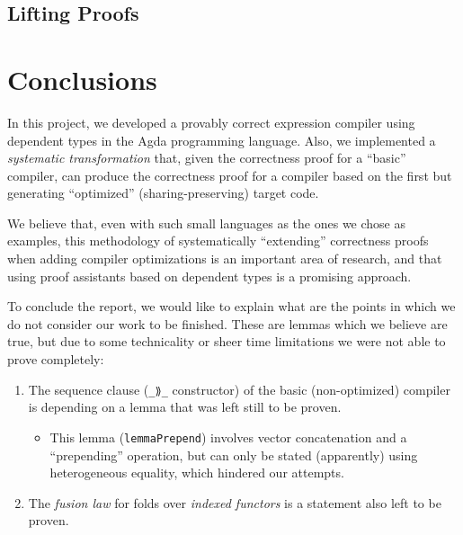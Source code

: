 \documentclass[a4paper]{article}
\begin{document}
        \subsection{Lifting Proofs}
        
        
        
        
        
        
    \section{Conclusions}
    \label{sec:conclusions}
        In this project, we developed a provably correct expression compiler using dependent types in the Agda programming language.
        Also, we implemented a \emph{systematic transformation} that, given the correctness proof for
        a ``basic'' compiler, can produce the correctness proof for a compiler based on the first but
        generating ``optimized'' (sharing-preserving) target code.

        We believe that, even with such small languages as the ones we chose as examples,
        this methodology of systematically ``extending'' correctness proofs when adding compiler optimizations
        is an important area of research, and that using proof assistants based on dependent types is a
        promising approach.

        To conclude the report, we would like to explain what are the points in which we do not consider our work
        to be finished. These are lemmas which we believe are true, but due to some technicality or sheer
        time limitations we were not able to prove completely:

        \begin{enumerate}
            \item The sequence clause (\texttt{\_⟫\_} constructor) of the basic (non-optimized) compiler
                is depending on a lemma that was left still to be proven.
                \begin{itemize}
                    \item This lemma (\texttt{lemmaPrepend}) involves vector concatenation and a ``prepending'' operation,
                        but can only be stated (apparently) using heterogeneous equality, which hindered our attempts.
                \end{itemize}

            \item The \emph{fusion law} for folds over \emph{indexed functors} is a statement also left
                to be proven.
        \end{enumerate}
\end{document}
